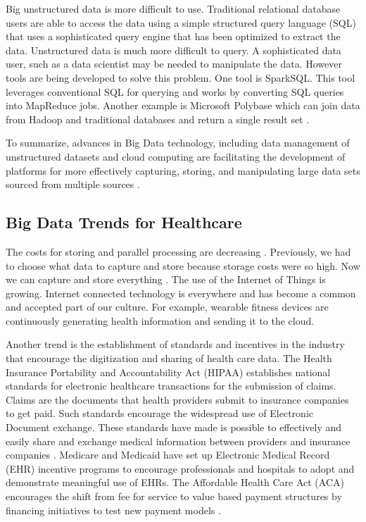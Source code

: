 \documentclass[sigconf]{acmart}
\begin{document}
Big unstructured data is more difficult to use.  Traditional relational database users are able to access the data using a simple structured query language (SQL) that uses a sophisticated query engine that has been optimized to extract the data.  Unstructured data is much more difficult to query. A sophisticated data user, such as a data scientist may be needed to manipulate the data. However tools are being developed to solve this problem. One tool is SparkSQL.  This tool leverages conventional SQL for querying and works by converting SQL queries into MapReduce jobs.  Another example is Microsoft Polybase which can join data from Hadoop and traditional databases and return a single result set \cite{www-google-HlthCat}. 

To summarize, advances in Big Data technology, including data management of unstructured datasets and cloud computing are facilitating the development of platforms for more effectively capturing, storing, and manipulating large data sets sourced from multiple sources \cite{springer}.  

\subsection{Big Data Trends for Healthcare}

The costs for storing and parallel processing are decreasing \cite{www-google-McDonald}. Previously, we had to choose what data to capture and store because storage costs were so high. Now we can capture and store everything \cite{www-google-hadoop}.
The use of the Internet of Things is growing. Internet connected technology is everywhere and has become a common and accepted part of our culture.  For example, wearable fitness devices are continuously generating health information and sending it to the cloud. 

Another trend is the establishment of standards and incentives in the industry that encourage the digitization and sharing of health care data.  The Health Insurance Portability and Accountability Act (HIPAA) establishes national standards for electronic healthcare transactions for the submission of claims. Claims are the documents that health providers submit to insurance companies to get paid. Such standards encourage the widespread use of Electronic Document exchange. These standards have made is possible to effectively and easily share and exchange medical information between providers and insurance companies \cite{www-google-McDonald}.  
Medicare and Medicaid have set up Electronic Medical Record (EHR) incentive programs to encourage professionals and hospitals to adopt and demonstrate meaningful use of EHRs.  The Affordable Health Care Act (ACA) encourages the shift from fee for service to value based payment structures by financing  initiatives to test new payment models \cite{www-google-ACA}.  
\end{document}
